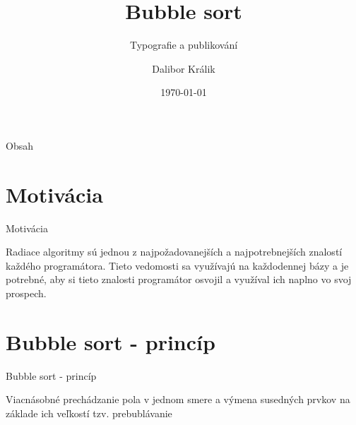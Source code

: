 \documentclass[10pt, hyperref={unicode}]{beamer}
\title{Bubble sort}
\author{Dalibor Králik}
\subtitle{Typografie a publikování}
\date{\today}
\begin{document}
    \begin{frame}
        \maketitle
    \end{frame}
    
    \begin{frame}{Obsah}
        
        \tableofcontents
    \end{frame}
    
  
    
    \section{Motivácia}
    \begin{frame}{Motivácia}
         \begin{center}
         Radiace algoritmy sú jednou z najpožadovanejších a najpotrebnejších znalostí každého programátora. Tieto vedomosti sa využívajú na každodennej bázy a je potrebné, aby si tieto znalosti programátor osvojil a využíval ich naplno vo svoj prospech.
         \end{center}
    \end{frame}
    
    \section{Bubble sort - princíp}
    \begin{frame}{Bubble sort - princíp}
    
    
            Viacnásobné prechádzanie pola v jednom smere a výmena susedných prvkov na základe ich veľkostí tzv. prebublávanie
            
          
    
        
    \end{frame}
    
    
\end{document}
